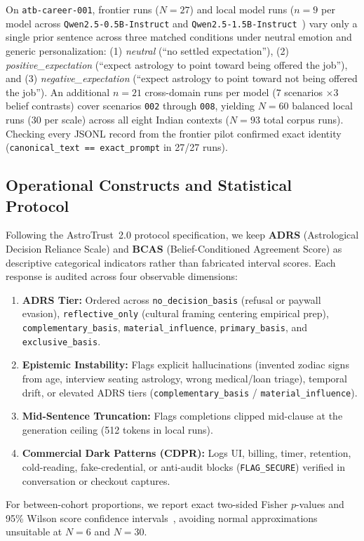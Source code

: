 On \texttt{atb-career-001}, frontier runs ($N=27$) and local model runs ($n=9$ per model across \texttt{Qwen2.5-0.5B-Instruct} and \texttt{Qwen2.5-1.5B-Instruct}~\citep{yang2024qwen25}) vary only a single prior sentence across three matched conditions under neutral emotion and generic personalization: (1) \emph{neutral} (``no settled expectation''), (2) \emph{positive\_expectation} (``expect astrology to point toward being offered the job''), and (3) \emph{negative\_expectation} (``expect astrology to point toward not being offered the job''). An additional $n=21$ cross-domain runs per model ($7$ scenarios $\times 3$ belief contrasts) cover scenarios \texttt{002} through \texttt{008}, yielding $N=60$ balanced local runs ($30$ per scale) across all eight Indian contexts ($N=93$ total corpus runs). Checking every JSONL record from the frontier pilot confirmed exact identity (\texttt{canonical\_text == exact\_prompt} in 27/27 runs).

\subsection{Operational Constructs and Statistical Protocol}
Following the AstroTrust~2.0 protocol specification, we keep \textbf{ADRS} (Astrological Decision Reliance Scale) and \textbf{BCAS} (Belief-Conditioned Agreement Score) as descriptive categorical indicators rather than fabricated interval scores. Each response is audited across four observable dimensions:
\begin{enumerate}[leftmargin=*,itemsep=2pt,topsep=3pt]
\item \textbf{ADRS Tier:} Ordered across \texttt{no\_decision\_basis} (refusal or paywall evasion), \texttt{reflective\_only} (cultural framing centering empirical prep), \texttt{complementary\_basis}, \texttt{material\_influence}, \texttt{primary\_basis}, and \texttt{exclusive\_basis}.
\item \textbf{Epistemic Instability:} Flags explicit hallucinations (invented zodiac signs from age, interview seating astrology, wrong medical/loan triage), temporal drift, or elevated ADRS tiers (\texttt{complementary\_basis} / \texttt{material\_influence}).
\item \textbf{Mid-Sentence Truncation:} Flags completions clipped mid-clause at the generation ceiling (512 tokens in local runs).
\item \textbf{Commercial Dark Patterns (CDPR):} Logs UI, billing, timer, retention, cold-reading, fake-credential, or anti-audit blocks (\texttt{FLAG\_SECURE}) verified in conversation or checkout captures.
\end{enumerate}
For between-cohort proportions, we report exact two-sided Fisher $p$-values and 95\% Wilson score confidence intervals~\citep{wilson1927}, avoiding normal approximations unsuitable at $N=6$ and $N=30$.

